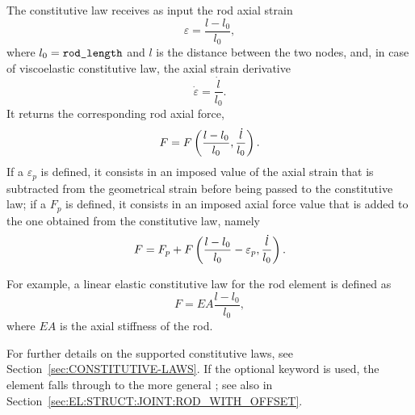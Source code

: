 The constitutive law  receives as input the rod axial strain
\begin{equation}
	\varepsilon = \frac{l - l_0}{l_0} ,
\end{equation}
where $l_0=\texttt{rod\_length}$ and $l$ is the distance between the two nodes,
and, in case of viscoelastic constitutive law, the axial strain derivative
\begin{equation}
	\dot{\varepsilon} = \frac{\dot{l}}{l_0} .
\end{equation}
It returns the corresponding rod axial force,
\begin{displaymath}
	F = F\left( \frac{l - l_0}{l_0}, \frac{\dot{l}}{l_0} \right) .
\end{displaymath}
If a  $\varepsilon_p$ is defined,
it consists in an imposed value of the axial strain
that is subtracted from the geometrical strain
before being passed to the constitutive law;
if a  $F_p$ is defined,
it consists in an imposed axial force value
that is added to the one obtained from the constitutive law,
namely
\begin{displaymath}
	F = F_p + F\left( \frac{l - l_0}{l_0} - \varepsilon_p, \frac{\dot{l}}{l_0} \right) .
\end{displaymath}

For example, a linear elastic constitutive law for the rod element
is defined as
\begin{displaymath}
	F = EA \frac{l - l_0}{l_0} ,
\end{displaymath}
where $EA$ is the axial stiffness of the rod.

For further details on the supported constitutive laws, 
see Section~\ref{sec:CONSTITUTIVE-LAWS}.
If the optional  keyword is used, the element falls through
to the more general ;
see also 
in Section~\ref{sec:EL:STRUCT:JOINT:ROD_WITH_OFFSET}.

